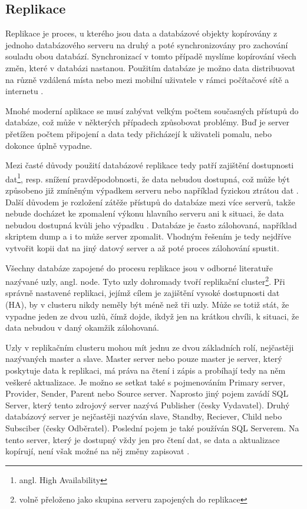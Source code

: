         \subsection{Replikace}
        \label{kReplikace}
Replikace je proces, u kterého jsou data a databázové objekty kopírovány z jednoho databázového serveru na druhý a poté synchronizovány pro zachování souladu obou databází. Synchronizací v tomto případě myslíme kopírování všech změn, které v databázi nastanou. Použitím databáze je možno data distribuovat na různě vzdálená místa nebo mezi mobilní uživatele v rámci počítačové sítě a internetu \citep{Microsoft2013}.

Mnohé moderní aplikace se musí zabývat velkým počtem současných přístupů do databáze, což může v některých případech způsobovat problémy. Buď je server přetížen počtem připojení a data tedy přicházejí k uživateli pomalu, nebo dokonce úplně vypadne. 

Mezi časté důvody použití databázové replikace tedy patří zajištění dostupnosti dat\footnote{angl. High Availability}, resp. snížení pravděpodobnosti, že data nebudou dostupná, což může být způsobeno již zmíněným výpadkem serveru nebo například fyzickou ztrátou dat \citep{ObeHsu2012}. Další důvodem je rozložení zátěže přístupů do databáze mezi více serverů, takže nebude docházet ke zpomalení výkonu hlavního serveru ani k situaci, že data nebudou dostupná kvůli jeho výpadku \citep{BellKindahlThalmann2010}. Databáze je často zálohovaná, například skriptem dump a i to může server zpomalit. Vhodným řešením je tedy nejdříve vytvořit kopii dat na jiný datový server a až poté proces zálohování spustit. 

Všechny databáze zapojené do procesu replikace jsou v odborné literatuře nazývané uzly, angl. node. Tyto uzly dohromady tvoří replikační cluster\footnote{volně přeloženo jako skupina serveru zapojených do replikace}. Při správně nastavené replikaci, jejímž cílem je zajištění vysoké dostupnosti dat (HA), by v clusteru nikdy neměly být méně než tři uzly. Může se totiž stát, že vypadne jeden ze dvou uzlů, čímž dojde, ikdyž jen na krátkou chvíli, k situaci, že data nebudou v daný okamžik zálohovaná. 

Uzly v replikačním clusteru mohou mít jednu ze dvou základních rolí, nejčastěji nazývaných master a slave. Master server nebo pouze master je server, který poskytuje data k replikaci, má práva na čtení i zápis a probíhají tedy na něm veškeré aktualizace. Je možno se setkat také s pojmenováním Primary server, Provider, Sender, Parent nebo Source server. Naprosto jiný pojem zavádí SQL Server, který tento zdrojový server nazývá Publisher (česky Vydavatel). Druhý databázový server je nejčastěji nazýván slave, Standby, Reciever, Child nebo Subsciber (česky Odběratel). Poslední pojem je také používán SQL Serverem. Na tento server, který je dostupný vždy jen pro čtení dat, se data a aktualizace kopírují, není však možné na něj změny zapisovat \citep{RiggsKrossing2010}.

